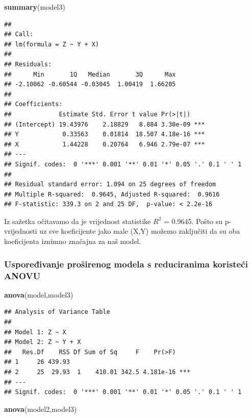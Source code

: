 \documentclass[]{article}
\newenvironment{Shaded}{\begin{snugshade}}{\end{snugshade}}
\newcommand{\KeywordTok}[1]{\textcolor[rgb]{0.13,0.29,0.53}{\textbf{{#1}}}}
\newcommand{\NormalTok}[1]{{#1}}
\begin{document}
\begin{Shaded}
\begin{Highlighting}[]
\KeywordTok{summary}\NormalTok{(model3)}
\end{Highlighting}
\end{Shaded}

\begin{verbatim}
## 
## Call:
## lm(formula = Z ~ Y + X)
## 
## Residuals:
##      Min       1Q   Median       3Q      Max 
## -2.10062 -0.60544 -0.03045  1.00419  1.66205 
## 
## Coefficients:
##             Estimate Std. Error t value Pr(>|t|)    
## (Intercept) 19.43976    2.18829   8.884 3.30e-09 ***
## Y            0.33563    0.01814  18.507 4.18e-16 ***
## X            1.44228    0.20764   6.946 2.79e-07 ***
## ---
## Signif. codes:  0 '***' 0.001 '**' 0.01 '*' 0.05 '.' 0.1 ' ' 1
## 
## Residual standard error: 1.094 on 25 degrees of freedom
## Multiple R-squared:  0.9645, Adjusted R-squared:  0.9616 
## F-statistic: 339.3 on 2 and 25 DF,  p-value: < 2.2e-16
\end{verbatim}

Iz sažetka očitavamo da je vrijednost statistike \(R^2\) = 0.9645. Pošto
su p-vrijednosti uz sve koeficijente jako male (X,Y) možemo zaključiti
da su oba koeficijenta iznimno značajna za naš model.

\subsubsection{Uspoređivanje proširenog modela s reduciranima koristeći
ANOVU}\label{usporeivanje-prosirenog-modela-s-reduciranima-koristeci-anovu}

\begin{Shaded}
\begin{Highlighting}[]
\KeywordTok{anova}\NormalTok{(model,model3)}
\end{Highlighting}
\end{Shaded}

\begin{verbatim}
## Analysis of Variance Table
## 
## Model 1: Z ~ X
## Model 2: Z ~ Y + X
##   Res.Df    RSS Df Sum of Sq     F    Pr(>F)    
## 1     26 439.93                                 
## 2     25  29.93  1    410.01 342.5 4.181e-16 ***
## ---
## Signif. codes:  0 '***' 0.001 '**' 0.01 '*' 0.05 '.' 0.1 ' ' 1
\end{verbatim}

\begin{Shaded}
\begin{Highlighting}[]
\KeywordTok{anova}\NormalTok{(model2,model3)}
\end{Highlighting}
\end{Shaded}
\end{document}
